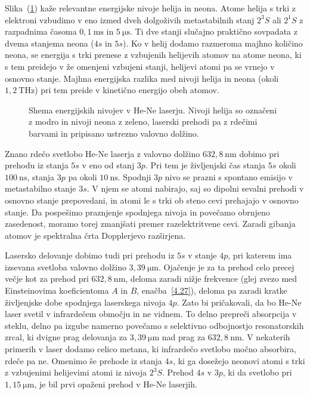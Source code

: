Slika~(\ref{fig:HeNeE}) kaže relevantne energijske nivoje helija in neona. 
Atome helija
s trki z elektroni vzbudimo v eno izmed dveh dolgoživih metastabilnih stanj $2^3S$ ali
$2^1S$ z razpadnima časoma $0,1~\si{\milli\second}$ in $5~\si{\micro\second}$.
Ti dve stanji slučajno praktično sovpadata z dvema stanjema neona ($4s$ in $5s$). 
Ko v helij dodamo razmeroma majhno količino neona, se energija s trki 
prenese z vzbujenih helijevih atomov na atome neona, ki s tem preidejo v 
že omenjeni vzbujeni stanji, helijevi atomi pa se vrnejo v osnovno stanje. 
Majhna energijska razlika med nivoji helija in neona (okoli $1,2~\si{\tera\hertz}$) pri 
tem preide v kinetično energijo obeh atomov. 
\begin{figure}[h]
\centering
\def\svgwidth{100truemm} 

\caption{Shema energijskih nivojev v He-Ne laserju. Nivoji helija so označeni
z modro in nivoji neona z zeleno, laserski prehodi pa z rdečimi barvami in pripisano
ustrezno valovno dolžino.}
\label{fig:HeNeE}
\end{figure}

Znano rdečo svetlobo He-Ne laserja z valovno dolžino $632,8~\si{\nano\metre}$ dobimo 
pri prehodu iz stanja $5s$ v eno od stanj $3p$. Pri tem je življenjski čas 
stanja $5s$ okoli $100~\si{\nano\second}$, stanja $3p$ pa okoli $10~\si{\nano\second}$.
Spodnji $3p$ nivo se prazni s spontano emisijo v metastabilno stanje $3s$. 
V njem se atomi nabirajo, saj so dipolni sevalni prehodi v osnovno stanje prepovedani,
in atomi le s trki ob steno cevi prehajajo v osnovno stanje. Da pospešimo
praznjenje spodnjega nivoja in povečamo obrnjeno zasedenost, moramo torej 
zmanjšati premer razelektritvene cevi. Zaradi gibanja atomov je spektralna 
črta Dopplerjevo razširjena. 

Lasersko delovanje dobimo tudi pri prehodu iz $5s$ v stanje $4p$, pri katerem 
ima izsevana svetloba valovno dolžino $3,39~\si{\micro\metre}$. 
Ojačenje je za ta prehod celo precej večje kot za
prehod pri $632,8~\si{\nano\metre}$, deloma zaradi nižje frekvence 
(glej zvezo med Einsteinovima koeficientoma $A$ in $B$, enačba~\ref{4.27}), 
deloma pa zaradi kratke življenjske dobe spodnjega laserskega nivoja $4p$. 
Zato bi pričakovali, da bo He-Ne laser svetil v infrardečem območju in ne vidnem. 
To delno prepreči absorpcija v steklu, delno pa izgube namerno povečamo s selektivno odbojnostjo
resonatorskih zrcal, ki dvigne prag delovanja za $3,39~\si{\micro\metre}$ 
nad prag za $632,8~\si{\nano\metre}$. V nekaterih primerih v laser dodamo
celico metana, ki infrardečo svetlobo močno absorbira, rdeče pa ne.
Omenimo še prehode iz stanja $4s$, ki ga dosežejo neonovi atomi s trki
z vzbujenimi helijevimi atomi iz nivoja $2^3S$. Prehod $4s$ v $3p$, ki da svetlobo
pri $1,15~\si{\micro\metre}$, je bil prvi opaženi prehod v He-Ne laserjih.

